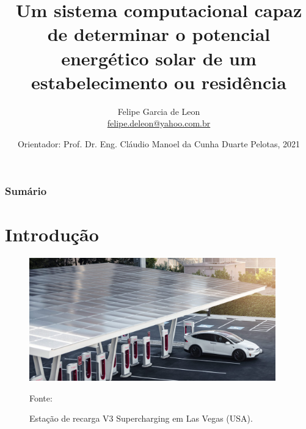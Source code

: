 \documentclass{beamer}
\title[Apresentação TCC II]{Um sistema computacional capaz de determinar o potencial energético solar de um estabelecimento ou residência}
\author[Felipe Leon]{
 \texorpdfstring{Felipe Garcia de Leon\\}{}
 \href{mailto:felipe.deleon@yahoo.com.br}{felipe.deleon@yahoo.com.br}
}
\institute[Universidade Federal de Pelotas]{}
\date[Pelotas - Dezembro 2021]{
  Orientador: Prof. Dr. Eng. Cláudio Manoel da Cunha Duarte
  Pelotas, 2021
}
\begin{document}
\begin{frame}
  \titlepage
\end{frame}


\begin{frame}
  \frametitle{Sumário}

  \tableofcontents
\end{frame}


\section{Introdução}

\begin{frame}

\begin{figure}[H]
    \centering
    \includegraphics[width=0.95\textwidth]{./Figuras/vegas_charge.jpeg}
    \caption{Estação de recarga V3 Supercharging em Las Vegas (USA).}{Fonte: \cite{tesla}}
   \label{fig:tesla_charge}
\end{figure}

\end{frame}
\end{document}

